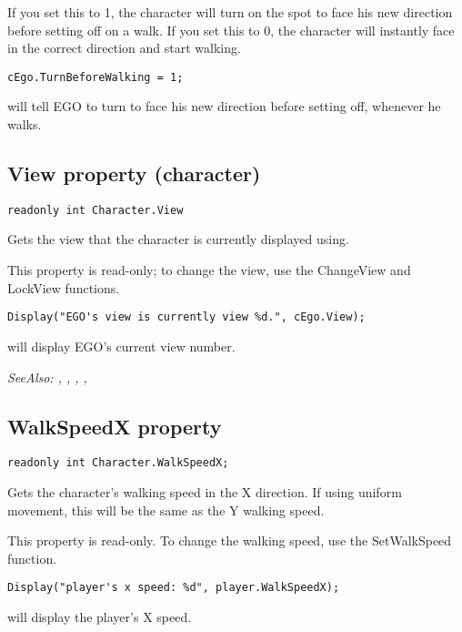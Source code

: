 If you set this to 1, the character will turn on the spot to face his new direction
before setting off on a walk. If you set this to 0, the character will instantly face
in the correct direction and start walking.

\begin{verbatim}
cEgo.TurnBeforeWalking = 1;
\end{verbatim}
will tell EGO to turn to face his new direction before setting off, whenever he walks.


\subsection{View property (character)}\label{Character.View}%

\begin{verbatim}
readonly int Character.View
\end{verbatim}
Gets the view that the character is currently displayed using.

This property is read-only; to change the view, use the ChangeView and LockView functions.

\begin{verbatim}
Display("EGO's view is currently view %d.", cEgo.View);
\end{verbatim}
will display EGO's current view number.

\it{SeeAlso:} ,
,
,
,


\subsection{WalkSpeedX property}\label{Character.WalkSpeedX}%

\begin{verbatim}
readonly int Character.WalkSpeedX;
\end{verbatim}

Gets the character's walking speed in the X direction. If using uniform movement,
this will be the same as the Y walking speed.

This property is read-only. To change the walking speed, use the SetWalkSpeed function.

\begin{verbatim}
Display("player's x speed: %d", player.WalkSpeedX);
\end{verbatim}
will display the player's X speed.

